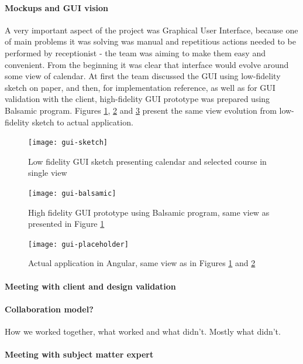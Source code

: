 \documentclass{article}
\begin{document}
\paragraph{Mockups and GUI vision}
A very important aspect of the project was Graphical User Interface, because one of main problems it was solving was manual and repetitious actions needed to be performed by receptionist - the team was aiming to make them easy and convenient. From the beginning it was clear that interface would evolve around some view of calendar. At first the team discussed the GUI using low-fidelity sketch on paper, and then, for implementation reference, as well as for GUI validation with the client, high-fidelity GUI prototype was prepared using Balsamic program. Figures \ref{fig:gui-sketch}, \ref{fig:gui-balsamic} and \ref{fig:gui-angular} present the same view evolution from low-fidelity sketch to actual application.

\begin{figure}[h]
    \texttt{[image: gui-sketch]}
    \caption{Low fidelity GUI sketch presenting calendar and selected course in single view}
    \label{fig:gui-sketch}
\end{figure}
\begin{figure}[h]
    \texttt{[image: gui-balsamic]}
    \caption{High fidelity GUI prototype using Balsamic program, same view as presented in Figure \ref{fig:gui-sketch}}
    \label{fig:gui-balsamic}
\end{figure}
\begin{figure}[h]
    \texttt{[image: gui-placeholder]}
    \caption{Actual application in Angular, same view as in Figures \ref{fig:gui-sketch} and \ref{fig:gui-balsamic}}
    \label{fig:gui-angular}
\end{figure}

\paragraph{Meeting with client and design validation}


\paragraph{Collaboration model?}
How we worked together, what worked and what didn't. Mostly what didn't.

\paragraph{Meeting with subject matter expert}
\end{document}
